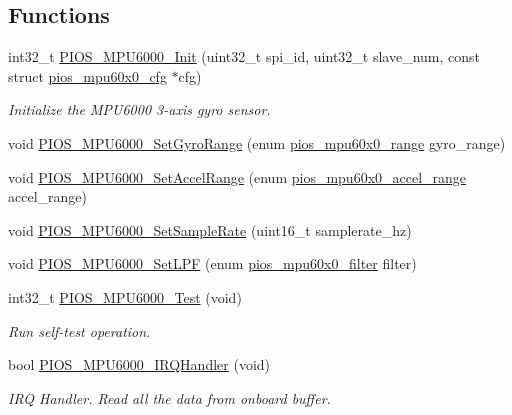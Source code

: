 \subsection*{\-Functions}
\begin{DoxyCompactItemize}
\item 
int32\-\_\-t \hyperlink{group___p_i_o_s___m_p_u6000_ga760dc0beda8303633fc946a9f9a2fc5f}{\-P\-I\-O\-S\-\_\-\-M\-P\-U6000\-\_\-\-Init} (uint32\-\_\-t spi\-\_\-id, uint32\-\_\-t slave\-\_\-num, const struct \hyperlink{structpios__mpu60x0__cfg}{pios\-\_\-mpu60x0\-\_\-cfg} $\ast$cfg)
\begin{DoxyCompactList}\small\item\em \-Initialize the \-M\-P\-U6000 3-\/axis gyro sensor. \end{DoxyCompactList}\item 
void \hyperlink{group___p_i_o_s___m_p_u6000_ga30de8c7bb6b3ad0bf178588f920fa2bd}{\-P\-I\-O\-S\-\_\-\-M\-P\-U6000\-\_\-\-Set\-Gyro\-Range} (enum \hyperlink{group___p_i_o_s___m_p_u60_x0_ga56700b0154a14cf67c9f8f44a86ad9c0}{pios\-\_\-mpu60x0\-\_\-range} gyro\-\_\-range)
\item 
void \hyperlink{group___p_i_o_s___m_p_u6000_ga98c0cfbab60e9d6bd76c79d98f9b132b}{\-P\-I\-O\-S\-\_\-\-M\-P\-U6000\-\_\-\-Set\-Accel\-Range} (enum \hyperlink{group___p_i_o_s___m_p_u60_x0_ga8f297bddae3eb43bbf7b54abc6494992}{pios\-\_\-mpu60x0\-\_\-accel\-\_\-range} accel\-\_\-range)
\item 
void \hyperlink{group___p_i_o_s___m_p_u6000_gafe485ba5675dc205bb3995d09bb5d9f1}{\-P\-I\-O\-S\-\_\-\-M\-P\-U6000\-\_\-\-Set\-Sample\-Rate} (uint16\-\_\-t samplerate\-\_\-hz)
\item 
void \hyperlink{group___p_i_o_s___m_p_u6000_ga2a5192c9f72585bd4511fde209df791b}{\-P\-I\-O\-S\-\_\-\-M\-P\-U6000\-\_\-\-Set\-L\-P\-F} (enum \hyperlink{group___p_i_o_s___m_p_u60_x0_gacce1988bc994f5ade6ac748c2bf0b924}{pios\-\_\-mpu60x0\-\_\-filter} filter)
\item 
int32\-\_\-t \hyperlink{group___p_i_o_s___m_p_u6000_ga3bb050e34318f12ec520194f3c6d8bc4}{\-P\-I\-O\-S\-\_\-\-M\-P\-U6000\-\_\-\-Test} (void)
\begin{DoxyCompactList}\small\item\em \-Run self-\/test operation. \end{DoxyCompactList}\item 
bool \hyperlink{group___p_i_o_s___m_p_u6000_ga4c18e34de1623b28467e377fce4ace05}{\-P\-I\-O\-S\-\_\-\-M\-P\-U6000\-\_\-\-I\-R\-Q\-Handler} (void)
\begin{DoxyCompactList}\small\item\em \-I\-R\-Q \-Handler. \-Read all the data from onboard buffer. \end{DoxyCompactList}\end{DoxyCompactItemize}


